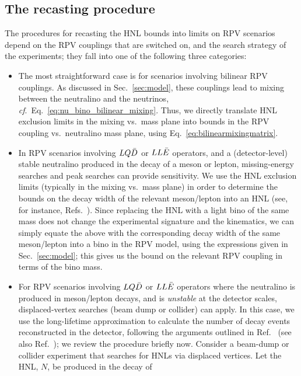 \subsection{The recasting procedure}
The procedures for recasting the HNL bounds into limits on RPV scenarios depend on the RPV couplings that 
are switched on, and the search strategy of the experiments; they fall into one of the following three 
categories: 
%
\begin{itemize}
    \item The most straightforward case is for scenarios involving bilinear RPV couplings. As discussed in 
    Sec.~\ref{sec:model}, these couplings lead to mixing between the neutralino and the neutrinos, 
    \textit{cf}.~Eq.~\eqref{eq:nu_bino_bilinear_mixing}. Thus, we directly translate HNL exclusion limits 
    in the mixing vs.~mass plane into bounds in the RPV coupling vs.~neutralino mass plane, using 
    Eq.~\eqref{eq:bilinearmixingmatrix}.
    \item In RPV scenarios involving $LQ\Bar{D}$ or $LL\Bar{E}$ operators, and a (detector-level) stable 
    neutralino produced in the decay of a meson or lepton, missing-energy searches and peak searches can 
    provide sensitivity. We use the HNL exclusion limits (typically in the mixing vs.~mass plane) in order 
    to determine the bounds on the decay width of the relevant meson/lepton into an HNL (see, for instance, 
    Refs.~\cite{Gorbunov:2007ak,Gorbunov:2020rjx}). Since replacing the HNL with a light bino of the same 
    mass does not change the experimental signature and the kinematics, we can simply equate the above with 
    the corresponding decay width of the same meson/lepton into a bino in the RPV model, using the 
    expressions given in Sec.~\ref{sec:model}; this gives us the bound on the relevant RPV coupling in 
    terms of the bino mass.
    \item For RPV scenarios involving $LQ\Bar{D}$ or $LL\Bar{E}$ operators where the neutralino is produced
    in meson/lepton decays, and is \textit{unstable} at the detector scales, displaced-vertex searches (beam dump or collider) can apply. In this case, we use the long-lifetime approximation to calculate the number 
    of decay events reconstructed in the detector, following the arguments outlined in 
    Ref.~\cite{Beltran:2023nli} (see also Ref.~\cite{Fernandez-Martinez:2023phj}); we review the procedure briefly now. Consider a beam-dump or collider 
    experiment that searches for HNLs via displaced vertices. Let the HNL, $N$, be produced in the decay of 

\end{itemize}
